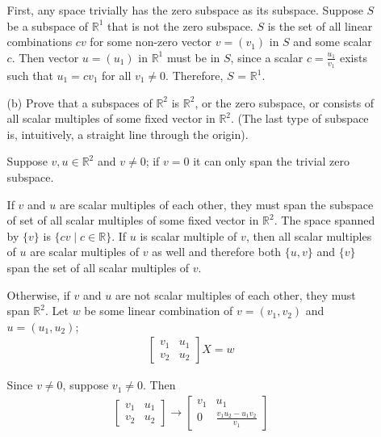 \documentclass{article}
\begin{document}
\begin{enumerate}[listparindent=\parindent]
\begin{enumerate}[listparindent=\parindent]
            First, any space trivially has the zero subspace as its subspace.
            Suppose \(S\) be a subspace of \(\mathbb{R}^1\) that is not the zero subspace.
            \(S\) is the set of all linear combinations \(cv\) for some non-zero vector \(v = (v_1)\) in \(S\) and some scalar \(c\).
            Then vector \(u = (u_1)\) in \(\mathbb{R}^1\) must be in \(S\), since a scalar \(c = \frac{u_1}{v_1}\) exists
            such that \(u_1 = cv_1\) for all \(v_1 \neq 0\). Therefore, \(S\) = \(\mathbb{R}^1\).

        \item[(b)] Prove that a subspaces of \(\mathbb{R}^2\) is \(\mathbb{R}^2\), or the zero subspace,
            or consists of all scalar multiples of some fixed vector in \(\mathbb{R}^2\).
            (The last type of subspace is, intuitively, a straight line through the origin).

            Suppose \(v, u \in \mathbb{R}^2\) and \(v \neq 0\); if \(v = 0\) it can only span the trivial zero subspace.

            If \(v\) and \(u\) are scalar multiples of each other, they must span the subspace of
            set of all scalar multiples of some fixed vector in \(\mathbb{R}^2\).
            The space spanned by \(\{v\}\) is \(\{cv \mid c \in \mathbb{R}\}\).
            If \(u\) is scalar multiple of \(v\), then all scalar multiples of \(u\) are scalar multiples of \(v\) as well
            and therefore both \(\{u, v\}\) and \(\{v\}\) span the set of all scalar multiples of \(v\).

            Otherwise, if \(v\) and \(u\) are not scalar multiples of each other, they must span \(\mathbb{R}^2\).
            Let \(w\) be some linear combination of \(v = (v_1, v_2)\) and \(u = (u_1, u_2)\);
            \begin{gather*}
                \begin{bmatrix}
                    v_1 & u_1 \\
                    v_2 & u_2
                \end{bmatrix}
                X
                =
                w
            \end{gather*}

            Since \(v \neq 0\), suppose \(v_1 \neq 0\). Then
            \begin{gather*}
                \begin{bmatrix}
                    v_1 & u_1 \\
                    v_2 & u_2
                \end{bmatrix}
                \rightarrow
                \begin{bmatrix}
                    v_1 & u_1 \\
                    0 & \frac{v_1u_2 - u_1v_2}{v_1}
                \end{bmatrix}
            \end{gather*}


\end{enumerate}
\end{enumerate}
\end{document}
